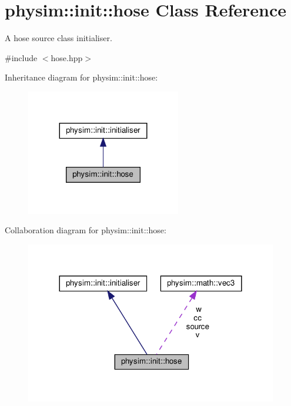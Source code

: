 \hypertarget{classphysim_1_1init_1_1hose}{}\section{physim\+:\+:init\+:\+:hose Class Reference}
\label{classphysim_1_1init_1_1hose}


A hose source class initialiser.  




{\ttfamily \#include $<$hose.\+hpp$>$}



Inheritance diagram for physim\+:\+:init\+:\+:hose\+:\nopagebreak
\begin{figure}[H]
\begin{center}
\leavevmode
\includegraphics[width=191pt]{classphysim_1_1init_1_1hose__inherit__graph}
\end{center}
\end{figure}


Collaboration diagram for physim\+:\+:init\+:\+:hose\+:\nopagebreak
\begin{figure}[H]
\begin{center}
\leavevmode
\includegraphics[width=312pt]{classphysim_1_1init_1_1hose__coll__graph}
\end{center}
\end{figure}
